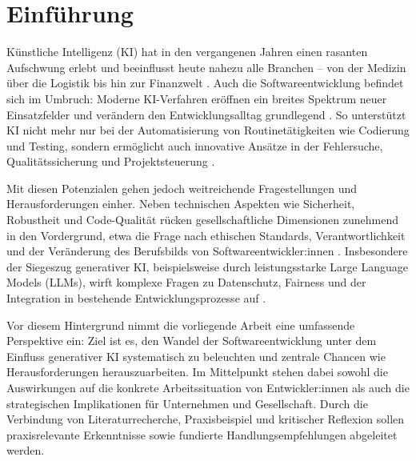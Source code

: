 \chapter{Einführung}


Künstliche Intelligenz (KI) hat in den vergangenen Jahren einen rasanten
Aufschwung erlebt und beeinflusst heute nahezu alle Branchen – von der Medizin
über die Logistik bis hin zur Finanzwelt \cite{a_ki_2024, s_future_2024}. Auch
die Softwareentwicklung befindet sich im Umbruch: Moderne KI-Verfahren eröffnen
ein breites Spektrum neuer Einsatzfelder und verändern den Entwicklungsalltag
grundlegend \cite{siebert_generative_2024}. So unterstützt KI nicht mehr nur
bei der Automatisierung von Routinetätigkeiten wie Codierung und Testing,
sondern ermöglicht auch innovative Ansätze in der Fehlersuche,
Qualitätssicherung und Projektsteuerung \cite{a_ki_2024,
    siebert_generative_2024}.

Mit diesen Potenzialen gehen jedoch weitreichende Fragestellungen und
Herausforderungen einher. Neben technischen Aspekten wie Sicherheit, Robustheit
und Code-Qualität rücken gesellschaftliche Dimensionen zunehmend in den
Vordergrund, etwa die Frage nach ethischen Standards, Verantwortlichkeit und
der Veränderung des Berufsbilds von Softwareentwickler:innen
\cite{braun_ki_2024, schmitt_generative_2024, weisz_design_2024}. Insbesondere
der Siegeszug generativer KI, beispielsweise durch leistungsstarke Large
Language Models (LLMs), wirft komplexe Fragen zu Datenschutz, Fairness und der
Integration in bestehende Entwicklungsprozesse auf \cite{s_future_2024,
    weisz_design_2024}.

Vor diesem Hintergrund nimmt die vorliegende Arbeit eine umfassende Perspektive
ein: Ziel ist es, den Wandel der Softwareentwicklung unter dem Einfluss
generativer KI systematisch zu beleuchten und zentrale Chancen wie
Herausforderungen herauszuarbeiten. Im Mittelpunkt stehen dabei sowohl die
Auswirkungen auf die konkrete Arbeitssituation von Entwickler:innen als auch
die strategischen Implikationen für Unternehmen und Gesellschaft. Durch die
Verbindung von Literaturrecherche, Praxisbeispiel und kritischer Reflexion
sollen praxisrelevante Erkenntnisse sowie fundierte Handlungsempfehlungen
abgeleitet werden.


